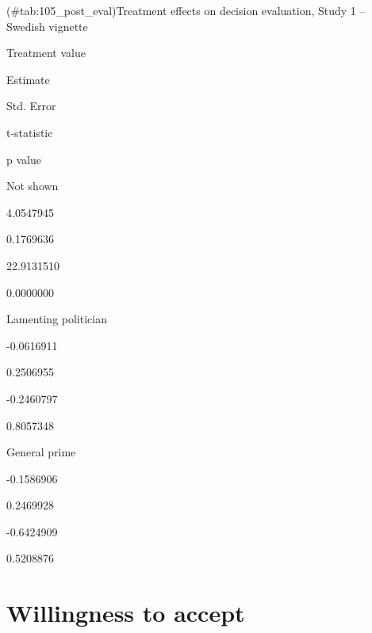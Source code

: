 \documentclass[]{book}
\begin{document}
(\#tab:105\_post\_eval)Treatment effects on decision evaluation, Study 1
-- Swedish vignette

Treatment value

Estimate

Std. Error

t-statistic

p value

Not shown

4.0547945

0.1769636

22.9131510

0.0000000

Lamenting politician

-0.0616911

0.2506955

-0.2460797

0.8057348

General prime

-0.1586906

0.2469928

-0.6424909

0.5208876

\section{Willingness to accept}\label{willingness-to-accept-1}
\end{document}
